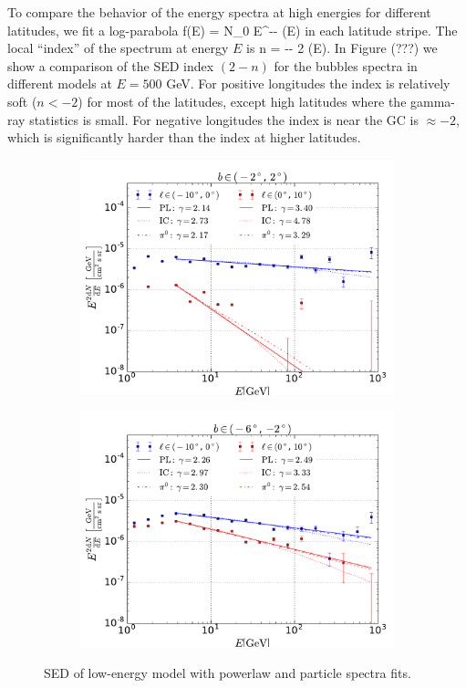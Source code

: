 To compare the behavior of the energy spectra at high energies for different latitudes, 
we fit a log-parabola
 \be
 f(E) = N_0 E^{-\alpha - \beta \ln(E)}
 \ee
in each latitude stripe. The local ``index'' of the spectrum at energy $E$ is
 \be 
n \equiv {} = -\alpha - 2 \beta \ln(E).
 \ee
In Figure (???) we show a comparison of the SED index $(2 - n)$
for the bubbles spectra in different models at $E = 500$ GeV.
For positive longitudes the index is relatively soft ($n < -2$) for most of the latitudes, 
except high latitudes where the gamma-ray statistics is small.
For negative longitudes the index is near the GC is $\approx -2$, 
which is significantly harder than the index at higher latitudes.

\begin{figure}[h!]
    \begin{subfigure}{0.5\textwidth}
        \includegraphics[width=\textwidth]{plots/SED_lowE_source_0.pdf}
    \end{subfigure} 
    \begin{subfigure}{0.5\textwidth}
        \includegraphics[width=\textwidth]{plots/SED_lowE_source_-4.pdf}
    \end{subfigure}
  	\caption{SED of low-energy model with powerlaw and particle spectra fits.}
  	\label{fig:SED_with_fits}
\end{figure}




